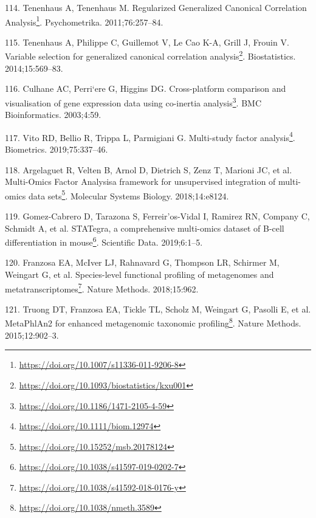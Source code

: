 \documentclass[
  a4paper,
]{book}
\DeclareRobustCommand{\href}[2]{#2\footnote{\url{#1}}}
\newlength{\cslhangindent}
\newlength{\cslentryspacingunit} %
\newenvironment{CSLReferences}[2] %
 {%
  \setlength{\parindent}{0pt}
  \ifodd #1
  \let\oldpar\par
  \def\par{\hangindent=\cslhangindent\oldpar}
  \fi
  \setlength{\parskip}{#2\cslentryspacingunit}
 }%
 {}
\begin{document}
\begin{CSLReferences}{0}{0}
\leavevmode{}%
114. Tenenhaus A, Tenenhaus M. \href{https://doi.org/10.1007/s11336-011-9206-8}{Regularized {Generalized Canonical Correlation Analysis}}. Psychometrika. 2011;76:257--84.

\leavevmode{}%
115. Tenenhaus A, Philippe C, Guillemot V, Le Cao K-A, Grill J, Frouin V. \href{https://doi.org/10.1093/biostatistics/kxu001}{Variable selection for generalized canonical correlation analysis}. Biostatistics. 2014;15:569--83.

\leavevmode{}%
116. Culhane AC, Perri`ere G, Higgins DG. \href{https://doi.org/10.1186/1471-2105-4-59}{Cross-platform comparison and visualisation of gene expression data using co-inertia analysis}. BMC Bioinformatics. 2003;4:59.

\leavevmode{}%
117. Vito RD, Bellio R, Trippa L, Parmigiani G. \href{https://doi.org/10.1111/biom.12974}{Multi-study factor analysis}. Biometrics. 2019;75:337--46.

\leavevmode{}%
118. Argelaguet R, Velten B, Arnol D, Dietrich S, Zenz T, Marioni JC, et al. \href{https://doi.org/10.15252/msb.20178124}{Multi-{Omics Factor Analysis}\textemdash{}a framework for unsupervised integration of multi-omics data sets}. Molecular Systems Biology. 2018;14:e8124.

\leavevmode{}%
119. Gomez-Cabrero D, Tarazona S, Ferreir'os-Vidal I, Ramirez RN, Company C, Schmidt A, et al. \href{https://doi.org/10.1038/s41597-019-0202-7}{{STATegra}, a comprehensive multi-omics dataset of {B}-cell differentiation in mouse}. Scientific Data. 2019;6:1--5.

\leavevmode{}%
120. Franzosa EA, McIver LJ, Rahnavard G, Thompson LR, Schirmer M, Weingart G, et al. \href{https://doi.org/10.1038/s41592-018-0176-y}{Species-level functional profiling of metagenomes and metatranscriptomes}. Nature Methods. 2018;15:962.

\leavevmode{}%
121. Truong DT, Franzosa EA, Tickle TL, Scholz M, Weingart G, Pasolli E, et al. \href{https://doi.org/10.1038/nmeth.3589}{MetaPhlAn2 for enhanced metagenomic taxonomic profiling}. Nature Methods. 2015;12:902--3.


\end{CSLReferences}
\end{document}
